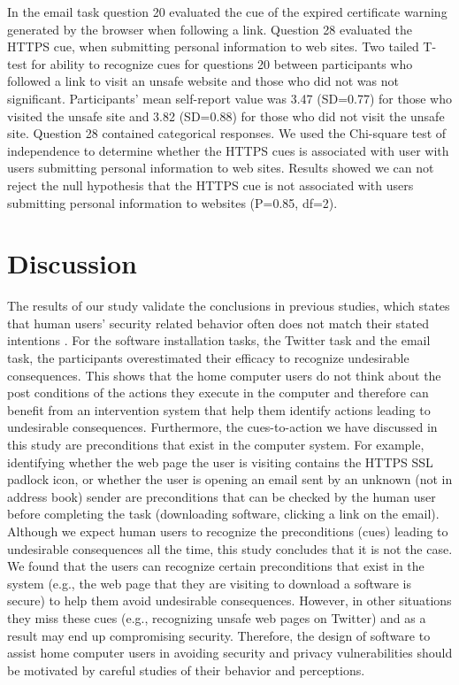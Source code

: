 In the email task question 20 evaluated the cue of the expired certificate warning generated by the browser when following a link. Question 28 evaluated the HTTPS cue, when submitting personal information to web sites. Two tailed T-test for ability to recognize cues for questions 20 between participants who followed a link to visit an unsafe website and those who did not was not significant. Participants' mean self-report value was 3.47 (SD=0.77) for those who visited the unsafe site and 3.82 (SD=0.88) for those who did not visit the unsafe site. Question 28 contained categorical responses. We used the Chi-square test of independence to determine whether the HTTPS cues is associated with user with users submitting personal information to web sites. Results showed we can not reject the null hypothesis that the HTTPS cue is not associated with users submitting personal information to websites (P=0.85, df=2).


\section{Discussion}
The results of our study validate the conclusions in previous studies, which states that human users' security related behavior often does not match their stated intentions \cite{davinson2010, govani2005, national2010}. 
For the software installation tasks, the Twitter task and the email task, the participants overestimated their efficacy to recognize undesirable consequences. This shows that the home computer users do not think about the post conditions of the actions they execute in the computer and therefore can benefit from an intervention system that help them identify actions leading to undesirable consequences.
Furthermore, the cues-to-action we have discussed in this study are preconditions that exist in the computer system. 
For example, identifying whether the web page the user is visiting contains the HTTPS SSL padlock icon, or whether the user is opening an email sent by an unknown (not in address book) sender are preconditions that can be checked by  the human user before completing the task (downloading software, clicking a link on the email).
Although we expect human users to recognize the preconditions (cues) leading to undesirable consequences all the time, this study concludes that it is not the case. 
We found that the users can recognize certain preconditions that exist in the system (e.g., the web page that they are visiting to download a software is secure) to help them avoid undesirable consequences. 
However, in other situations they miss these cues (e.g., recognizing unsafe web pages on Twitter) and as a result may end up compromising security.
Therefore, the design of software to assist home computer users in avoiding security and privacy vulnerabilities should be motivated by careful studies of their behavior and perceptions.


